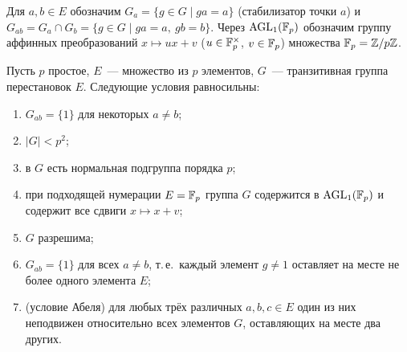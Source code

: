 Для $a,b\in E$ обозначим $G_a=\{g\in G\mid ga=a\}$ (стабилизатор точки $a$) и $G_{ab}=G_a\cap G_b=\{g\in G\mid ga=a,\ gb=b\}$. Через $\mathrm{AGL}_1(\mathbb F_p)$ обозначим группу аффинных
преобразований $x\mapsto ux+v$ ($u\in\mathbb F_p^\times$, $v\in\mathbb F_p$) множества $\mathbb F_p=\mathbb Z/p\mathbb Z$.

\begin{theorem}
Пусть $p$ простое, $E$~--- множество из $p$ элементов, $G$~--- транзитивная группа перестановок $E$. Следующие условия
равносильны:
\begin{enumerate}[label=\textup{(\roman*)}]
\item $G_{ab}=\{1\}$ для некоторых $a\ne b$;
\item $|G|<p^2$;
\item в $G$ есть нормальная подгруппа порядка $p$;
\item при подходящей нумерации $E=\mathbb F_p$ группа $G$ содержится в $\mathrm{AGL}_1(\mathbb F_p)$ и содержит все сдвиги $x\mapsto x+v$;
\item $G$ разрешима;
\item $G_{ab}=\{1\}$ для всех $a\ne b$, т.\,е.\ каждый элемент $g\ne1$ оставляет на месте не более одного элемента $E$;
\item \textup(условие Абеля\textup) для любых трёх различных $a,b,c\in E$ один из них неподвижен относительно всех
элементов $G$, оставляющих на месте два других.
\end{enumerate}
\end{theorem}

